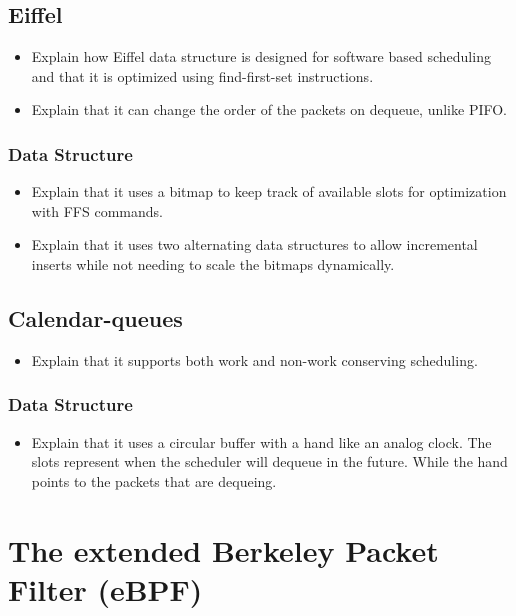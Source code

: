 \documentclass[sigconf, nonacm]{acmart}
\begin{document}
\subsection{Eiffel}

\begin{itemize}
  \item Explain how Eiffel\cite{Saeed2019} data structure is designed for software based scheduling and that it is optimized using find-first-set instructions.
  \item Explain that it can change the order of the packets on dequeue, unlike PIFO.
\end{itemize}


\subsubsection{Data Structure}

\begin{itemize}
  \item Explain that it uses a bitmap to keep track of available slots for optimization with FFS commands.
  \item Explain that it uses two alternating data structures to allow incremental inserts while not needing to scale the bitmaps dynamically.
\end{itemize}


\subsection{Calendar-queues}

\begin{itemize}
  \item Explain that it supports both work and non-work conserving scheduling.
\end{itemize}


\subsubsection{Data Structure}

\begin{itemize}
  \item Explain that it uses a circular buffer with a hand like an analog clock. The slots represent when the scheduler will dequeue in the future. While the hand points to the packets that are dequeing.
\end{itemize}


\section{The extended Berkeley Packet Filter (eBPF)}
\end{document}
